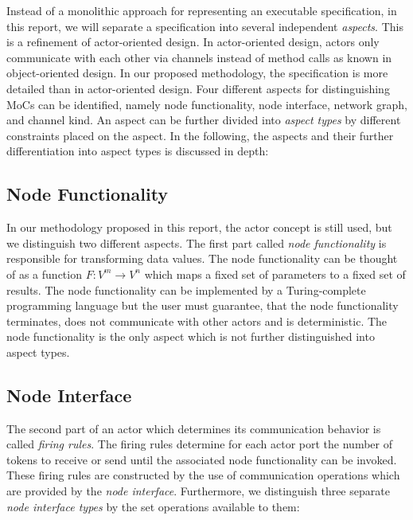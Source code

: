Instead of a monolithic approach for representing an executable specification,
in this report, we will separate a specification into several
independent \emph{aspects}.
This is a refinement of actor-oriented design.
In actor-oriented design, actors only
communicate with each other via channels instead of method calls as known
in object-oriented design. In our proposed methodology, the specification is more
detailed than in actor-oriented design.
Four different aspects for distinguishing MoCs can be identified,
namely node functionality, node interface, network graph, and
channel kind. An aspect can be further divided into
\emph{aspect types} by different constraints placed on the aspect.
In the following, the aspects and their further
differentiation into aspect types is discussed in depth:

\subsection{Node Functionality}\label{node-functionality}

In our methodology proposed in this report, the actor concept is still used,
but we distinguish two different aspects.
The first part called \emph{node functionality} is responsible
for transforming data values. The node functionality can be
thought of as a function $F: V^{m} \to V^{n}$  which maps a fixed set
of parameters to a fixed set of results. The node functionality
can be implemented by a Turing-complete programming language but
the user must guarantee, that the node functionality terminates,
does not communicate with other actors and is deterministic.
The node functionality is the only aspect which is not
further distinguished into aspect types.

\subsection{Node Interface}\label{node-interface}

The second part of an actor which determines its communication
behavior is called \emph{firing rules}. The firing rules
determine for each actor port the number of tokens to receive or send
until the associated node functionality can be invoked.
These firing rules are
constructed by the use of communication operations which are
provided by the \emph{node interface}. Furthermore, we
distinguish three separate \emph{node interface types} by the set
operations available to them:


